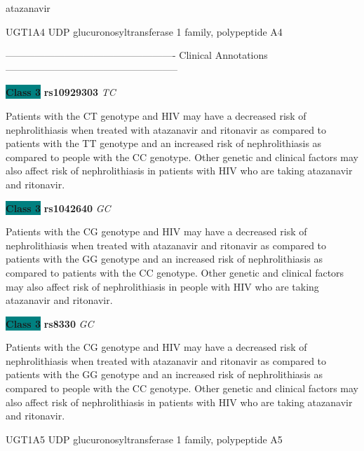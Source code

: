 \documentclass{resume} %
\begin{document}
\begin{rSection}{ atazanavir }
\begin{rSubsection}{ UGT1A4 }{ UDP glucuronosyltransferase 1 family, polypeptide A4 }{}{}
\item[] ---------------------------------------------------- Clinical Annotations -----------------------------------------------------\newline
\item \textbf{\colorbox{teal} {Class 3}} \textbf{ rs10929303 } \textit{ TC }
\item[] Patients with the CT genotype and HIV may have a decreased risk of nephrolithiasis when treated with atazanavir and ritonavir as compared to patients with the TT genotype and an increased risk of nephrolithiasis as compared to people with the CC genotype. Other genetic and clinical factors may also affect risk of nephrolithiasis in patients with HIV who are taking atazanavir and ritonavir. \item \textbf{\colorbox{teal} {Class 3}} \textbf{ rs1042640 } \textit{ GC }
\item[] Patients with the CG genotype and HIV may have a decreased risk of nephrolithiasis when treated with atazanavir and ritonavir as compared to patients with the GG genotype and an increased risk of nephrolithiasis as compared to patients with the CC genotype. Other genetic and clinical factors may also affect risk of nephrolithiasis in people with HIV who are taking atazanavir and ritonavir.\item \textbf{\colorbox{teal} {Class 3}} \textbf{ rs8330 } \textit{ GC }
\item[] Patients with the CG genotype and HIV may have a decreased risk of nephrolithiasis when treated with atazanavir and ritonavir as compared to patients with the GG genotype and an increased risk of nephrolithiasis as compared to people with the CC genotype. Other genetic and clinical factors may also affect risk of nephrolithiasis in patients with HIV who are taking atazanavir and ritonavir.
\end{rSubsection}\begin{rSubsection}{ UGT1A5 }{ UDP glucuronosyltransferase 1 family, polypeptide A5 }{}{}
\item[]


\end{rSubsection}
\end{rSection}
\end{document}
